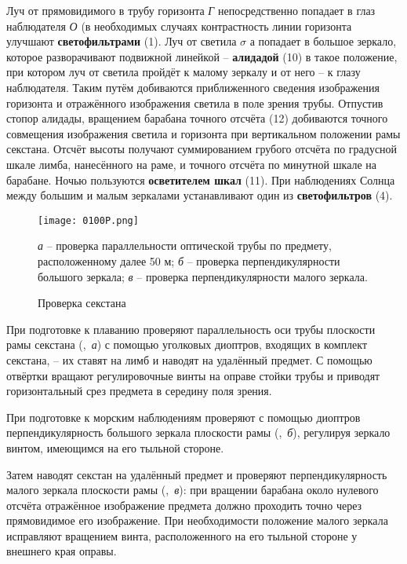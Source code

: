 Луч от прямовидимого в трубу горизонта \textit{Г} непосредственно
попадает в глаз наблюдателя \textit{О} (в необходимых случаях
контрастность линии горизонта улучшают \textbf{светофильтрами}
(1). Луч от светила $\sigma$ а попадает в большое зеркало, которое
разворачивают подвижной линейкой \--- \textbf{алидадой} (10) в такое
положение, при котором луч от светила пройдёт к малому зеркалу и от
него \--- к глазу наблюдателя. Таким путём добиваются приближенного
сведения изображения горизонта и отражённого изображения светила в
поле зрения трубы. Отпустив стопор алидады, вращением барабана точного
отсчёта (12) добиваются точного совмещения изображения светила и
горизонта при вертикальном положении рамы секстана. Отсчёт высоты
получают суммированием грубого отсчёта по градусной шкале лимба,
нанесённого на раме, и точного отсчёта по минутной шкале на
барабане. Ночью пользуются \textbf{осветителем шкал} (11). При
наблюдениях Солнца между большим и малым зеркалами устанавливают один
из \textbf{светофильтров} (4).

\begin{figure}[!htb]
  \centering
  \texttt{[image: 0100P.png]}
  \caption{Проверка секстана}
  \label{fig:100}
  \small
  \textit{а} \--- проверка параллельности оптической трубы по предмету, расположенному далее 50 м;
  \textit{б} \--- проверка перпендикулярности большого зеркала;
  \textit{в} \--- проверка перпендикулярности малого зеркала.

\end{figure}

При подготовке к плаванию проверяют параллельность оси трубы плоскости
рамы секстана (,~\textit{а}) с помощью уголковых диоптров,
входящих в комплект секстана, \--- их ставят на лимб и наводят на
удалённый предмет. С помощью отвёртки вращают регулировочные винты на
оправе стойки трубы и приводят горизонтальный срез предмета в середину
поля зрения.

При подготовке к морским наблюдениям проверяют с помощью диоптров
перпендикулярность большого зеркала плоскости рамы (,~\textit{б}),
регулируя зеркало винтом, имеющимся на его тыльной стороне.

Затем наводят секстан на удалённый предмет и проверяют
перпендикулярность малого зеркала плоскости рамы (,~\textit{в}): при
вращении барабана около нулевого отсчёта отражённое изображение
предмета должно проходить точно через прямовидимое его
изображение. При необходимости положение малого зеркала исправляют
вращением винта, расположенного на его тыльной стороне у внешнего края
оправы.

